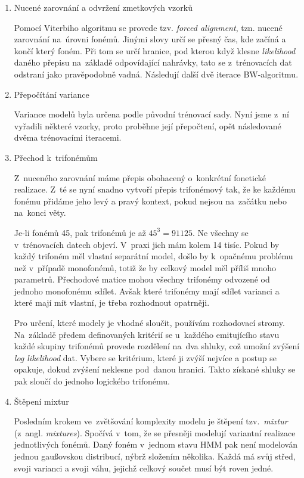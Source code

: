 \begin{enumerate}
\item{Nucené zarovnání a odvržení zmetkových vzorků}

Pomocí Viterbiho algoritmu\cite{forney1973viterbi} se provede tzv.
\textit{forced alignment}, tzn. nucené zarovnání na~úrovni fonémů. Jinými slovy
určí se přesný čas, kde začíná a končí který foném. Při tom se určí hranice, pod
kterou když klesne \textit{likelihood} daného přepisu na~základě odpovídající
nahrávky, tato se z~trénovacích dat odstraní jako pravěpodobně vadná. Následují
další dvě iterace BW-algoritmu.

\item{Přepočítání variance}

Variance modelů byla určena podle původní trénovací sady. Nyní jsme z~ní
vyřadili některé vzorky, proto proběhne její přepočtení, opět následované dvěma
trénovacími iteracemi.

\item{Přechod k~trifonémům}
\label{item:htktrain:triphones}

Z~nuceného zarovnání máme přepis obohacený o~konkrétní fonetické realizace. Z~té
se nyní snadno vytvoří přepis trifonémový tak, že ke každému fonému přidáme
jeho levý a pravý kontext, pokud nejsou na~začátku nebo na~konci věty.

Je-li fonémů 45, pak trifonémů je až $45^3 = 91125$. Ne všechny se v~trénovacích
datech objeví. V~praxi jich mám kolem 14 tisíc. Pokud by každý trifoném měl
vlastní separátní model, došlo by k~opačnému problému než v~případě monofonémů,
totiž že by celkový model měl příliš mnoho parametrů. Přechodové matice mohou
všechny trifonémy odvozené od jednoho monofonému sdílet. Avšak které trifonémy
mají sdílet varianci a které mají mít vlastní, je třeba rozhodnout opatrněji.

Pro určení, které modely je vhodné sloučit, používám rozhodovací stromy.
Na~základě předem definovaných kritérií se u~každého emitujícího stavu každé
skupiny trifonémů provede rozdělení na~dva shluky, což umožní zvýšení
\textit{log likelihood} dat. Vybere se kritérium, které ji zvýší nejvíce a
postup se opakuje, dokud zvýšení neklesne pod~danou hranici. Takto získané
shluky se pak sloučí do jednoho logického trifonému.

\item{Štěpení mixtur}

Posledním krokem ve~zvětšování komplexity modelu je štěpení tzv.~\textit{mixtur}
(z~angl. \textit{mixtures}). Spočívá v~tom, že se přesněji modelují variantní
realizace jednotlivých fonémů. Daný foném v~jednom stavu HMM pak není modelován jednou gaußovskou
distribucí, nýbrž složením několika. Každá má svůj střed, svoji varianci a svoji
váhu, jejichž celkový součet musí být roven jedné.


\end{enumerate}
